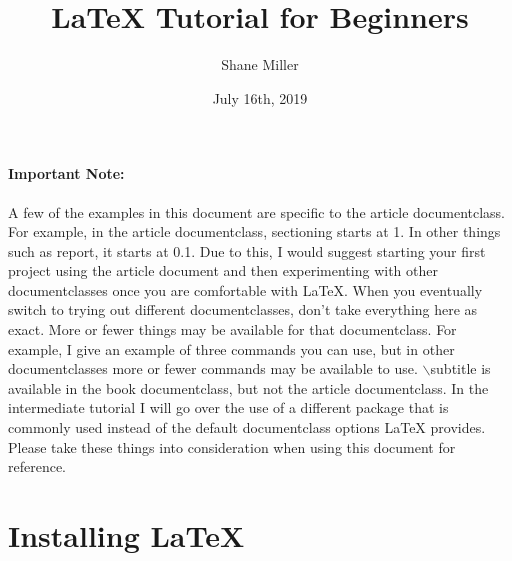 \documentclass{article}
\title{\LaTeX{} Tutorial for Beginners}
\author{Shane Miller}
\date{July 16th, 2019}
\begin{document}
	\maketitle
	\newpage
	
	\tableofcontents
	\newpage

	
	\paragraph{Important Note:}
		A few of the examples in this document are specific to the article documentclass. For example, in the article documentclass, sectioning starts at 1. In other things such as report, it starts at 0.1. Due to this, I would suggest starting your first project using the article document and then experimenting with other documentclasses once you are comfortable with \LaTeX{}. When you eventually switch to trying out different documentclasses, don\rq{}t take everything here as exact. More or fewer things may be available for that documentclass. For example, I give an example of three commands you can use, but in other documentclasses more or fewer commands may be available to use. $\backslash$subtitle is available in the book documentclass, but not the article documentclass. In the intermediate tutorial I will go over the use of a different package that is commonly used instead of the default documentclass options \LaTeX{} provides. Please take these things into consideration when using this document for reference.
	
	\section{Installing \LaTeX{}}
\end{document}
